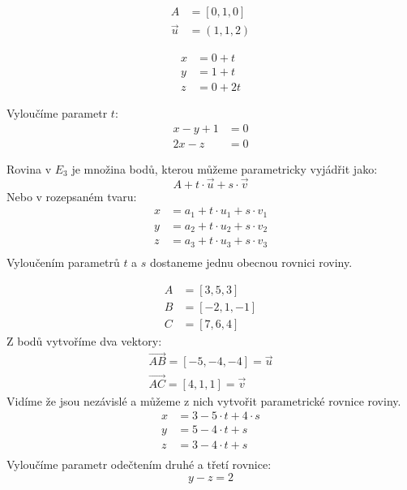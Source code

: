 \begin{example}
    \begin{align*}
        A &= [0, 1, 0]\\
        \vec{u} &= (1, 1, 2)
    \end{align*}

    \begin{align*}
        x &= 0 + t\\
        y &= 1 + t\\
        z &= 0 + 2t
    \end{align*}

    Vyloučíme parametr $t$:
    \begin{align*}
        x -y + 1&= 0\\
        2x -z &=0
    \end{align*}
\end{example}

\begin{definition}[Rovina v $E_3$]
    Rovina v $E_3$ je množina bodů, kterou můžeme parametricky vyjádřit jako:
    $$A + t\cdot \vec{u} + s \cdot \vec{v}$$
    Nebo v rozepsaném tvaru:
    \begin{align*}
        x &= a_1 + t\cdot u_1 + s \cdot v_1\\
        y &= a_2 + t\cdot u_2 + s \cdot v_2\\
        z &= a_3 + t\cdot u_3 + s \cdot v_3\\
    \end{align*}
    Vyloučením parametrů $t$ a $s$ dostaneme jednu obecnou rovnici roviny.
\end{definition}

\begin{example}
    \begin{align*}
        A &= [3, 5, 3]\\
        B &= [-2, 1, -1]\\
        C &= [7, 6, 4]
    \end{align*}
    Z bodů vytvoříme dva vektory:
    \begin{align*}
        \vec{AB} = [-5, -4, -4] = \vec{u}\\
        \vec{AC} = [4, 1, 1] = \vec{v}
    \end{align*}
    Vidíme že jsou nezávislé a můžeme z nich vytvořit parametrické rovnice roviny.
    \begin{align*}
        x &= 3 - 5 \cdot t + 4\cdot s\\
        y &= 5 - 4 \cdot t + s\\
        z &= 3 - 4 \cdot t + s\\
    \end{align*}
    Vyloučíme parametr odečtením druhé a třetí rovnice:
    $$y - z = 2$$
\end{example}

